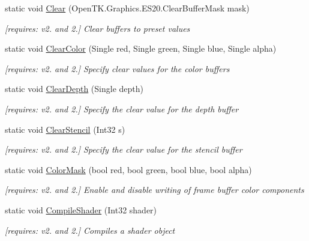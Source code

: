 \begin{DoxyCompactItemize}
static void \hyperlink{class_open_t_k_1_1_graphics_1_1_e_s20_1_1_g_l_a92d19483de153b0a66f3d083a3d1f447}{Clear} (Open\-T\-K.\-Graphics.\-E\-S20.\-Clear\-Buffer\-Mask mask)
\begin{DoxyCompactList}\small\item\em \mbox{[}requires\-: v2. and 2.\mbox{]} Clear buffers to preset values \end{DoxyCompactList}\item 
static void \hyperlink{class_open_t_k_1_1_graphics_1_1_e_s20_1_1_g_l_a0a4dbccf195e1c16aa8a3b15085a3e8e}{Clear\-Color} (Single red, Single green, Single blue, Single alpha)
\begin{DoxyCompactList}\small\item\em \mbox{[}requires\-: v2. and 2.\mbox{]} Specify clear values for the color buffers \end{DoxyCompactList}\item 
static void \hyperlink{class_open_t_k_1_1_graphics_1_1_e_s20_1_1_g_l_ab93bfb313a101482e56e9cbc49588cc9}{Clear\-Depth} (Single depth)
\begin{DoxyCompactList}\small\item\em \mbox{[}requires\-: v2. and 2.\mbox{]} Specify the clear value for the depth buffer \end{DoxyCompactList}\item 
static void \hyperlink{class_open_t_k_1_1_graphics_1_1_e_s20_1_1_g_l_a065bf26cfc78cda133e13e48127de03e}{Clear\-Stencil} (Int32 s)
\begin{DoxyCompactList}\small\item\em \mbox{[}requires\-: v2. and 2.\mbox{]} Specify the clear value for the stencil buffer \end{DoxyCompactList}\item 
static void \hyperlink{class_open_t_k_1_1_graphics_1_1_e_s20_1_1_g_l_a2b99088914e07ce3619d11069856b0b2}{Color\-Mask} (bool red, bool green, bool blue, bool alpha)
\begin{DoxyCompactList}\small\item\em \mbox{[}requires\-: v2. and 2.\mbox{]} Enable and disable writing of frame buffer color components \end{DoxyCompactList}\item 
static void \hyperlink{class_open_t_k_1_1_graphics_1_1_e_s20_1_1_g_l_af2f690266857375c680d95792ee799b9}{Compile\-Shader} (Int32 shader)
\begin{DoxyCompactList}\small\item\em \mbox{[}requires\-: v2. and 2.\mbox{]} Compiles a shader object \end{DoxyCompactList}\item 

\end{DoxyCompactItemize}
